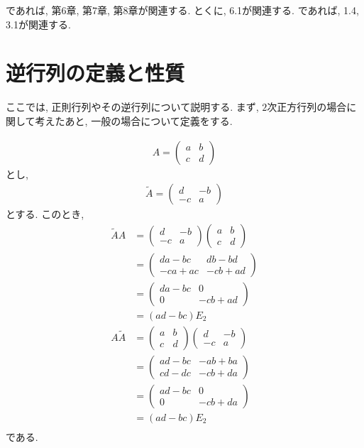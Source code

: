 \cite{978-4-7806-0772-7}であれば,
第6章, 第7章, 第8章が関連する.
とくに, 6.1が関連する.
\cite{978-4-7806-0164-0}であれば,
1.4, 3.1が関連する.

\section{逆行列の定義と性質}
\label{sec:regular}
ここでは, 正則行列やその逆行列について説明する.
まず,
$2$次正方行列の場合に関して考えたあと,
一般の場合について定義をする.


\begin{align*}
  A=
  \begin{pmatrix}
    a&b\\c&d
  \end{pmatrix}
\end{align*}
とし,
\begin{align*}
  \tilde A =
  \begin{pmatrix}
    d&-b\\-c&a
  \end{pmatrix}
\end{align*}
とする.
このとき,
\begin{align*}
  \tilde A A
  &=
  \begin{pmatrix}
    d&-b\\-c&a
  \end{pmatrix}
  \begin{pmatrix}
    a&b\\c&d
  \end{pmatrix}\\
  &=
  \begin{pmatrix}
    da-bc&db-bd\\-ca+ac&-cb +ad
  \end{pmatrix}\\
  &=
  \begin{pmatrix}
    da-bc&0\\0&-cb +ad
  \end{pmatrix}\\
  &=(ad-bc)E_2\\  
A  \tilde A 
  &=
  \begin{pmatrix}
    a&b\\c&d
  \end{pmatrix}
  \begin{pmatrix}
    d&-b\\-c&a
  \end{pmatrix}\\
  &=
  \begin{pmatrix}
    ad-bc&-ab+ba\\cd-dc&-cb +da
  \end{pmatrix}\\
  &=
  \begin{pmatrix}
    ad-bc&0\\0&-cb +da
  \end{pmatrix}\\
  &=(ad-bc)E_2\\  
\end{align*}
である.

